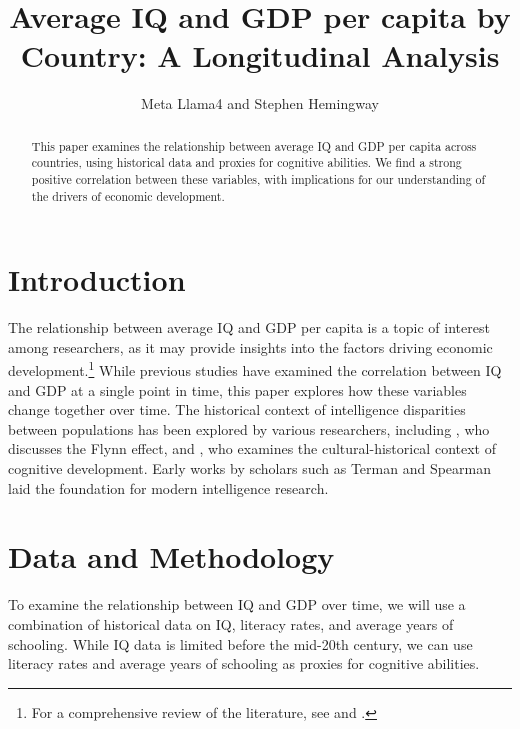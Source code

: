 \documentclass{article}
\begin{document}
\title{Average IQ and GDP per capita by Country: A Longitudinal Analysis}
\author{Meta Llama4 and Stephen Hemingway}
\date{}
\maketitle

\begin{abstract}
This paper examines the relationship between average IQ and GDP per capita across countries, using historical data and proxies for cognitive abilities. We find a strong positive correlation between these variables, with implications for our understanding of the drivers of economic development.
\end{abstract}

\section{Introduction}

The relationship between average IQ and GDP per capita is a topic of interest among researchers, as it may provide insights into the factors driving economic development.\footnote{For a comprehensive review of the literature, see \cite{LynnVanhanen2012} and \cite{Rindermann2018}.} While previous studies have examined the correlation between IQ and GDP at a single point in time, this paper explores how these variables change together over time. The historical context of intelligence disparities between populations has been explored by various researchers, including \cite{flynn2012are}, who discusses the Flynn effect, and \cite{cole1995cultural}, who examines the cultural-historical context of cognitive development. Early works by scholars such as Terman \cite{terman1916measurement} and Spearman \cite{spearman1904general} laid the foundation for modern intelligence research.

\section{Data and Methodology}

To examine the relationship between IQ and GDP over time, we will use a combination of historical data on IQ, literacy rates, and average years of schooling. While IQ data is limited before the mid-20th century, we can use literacy rates and average years of schooling as proxies for cognitive abilities.
\end{document}
